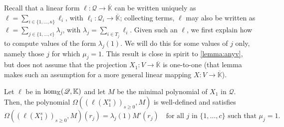 \documentclass[12pt]{article}
\newcommand{\lf}{X}
\newcommand{\residueI}{\mathscr{Q}}
\def\dg{\kappa}
\def\K{\mathbb{K}}
\def\K {\ensuremath{\mathbb{K}}}
\def\Kbar {{\ensuremath{\overline{\mathbb{K}}}}}
\begin{document}
Recall that a linear form $\ell: \residueI \to \Kbar$ can be written uniquely
as $\ell=\sum_{i\in \{1,\dots,\dg\}} \ell_i$, with $\ell_i:\residueI_i \to
\Kbar$; collecting terms, $\ell$ may also be written as $\ell=\sum_{j
	\in \{1,\dots,c\}} \lambda_j$, with $\lambda_j=\sum_{i \in T_j}
\ell_i$.  Given such an $\ell$, we first explain how to compute values
of the form $\lambda_j(1)$. We will do this for some values of $j$
only, namely those $j$ for which $\mu_j=1$. This result is close in 
spirit to \cref{lemma:anyv}, but does not assume that the projection
$X_1: V \to \Kbar$ is one-to-one (that lemma makes such an 
assumption for a more general linear mapping  $\lf:V\to \Kbar$).

\begin{lemma}\label{lemma:valuelambda}
  Let $\ell$ be in ${\rm hom}_\K(\residueI,\K)$ and let $M$ be the minimal
  polynomial of $X_1$ in $\residueI$. Then, the polynomial
  $\Omega((\ell(X_1^s))_{s\ge0},M)$ is well-defined and satisfies
  $$\Omega((\ell(X_1^s))_{s\ge0},M)(r_j) = \lambda_j(1) M'(r_j) \quad \text{for all $j$ in $\{1,\dots,c\}$ such that $\mu_j=1$.}$$
\end{lemma}
\end{document}
